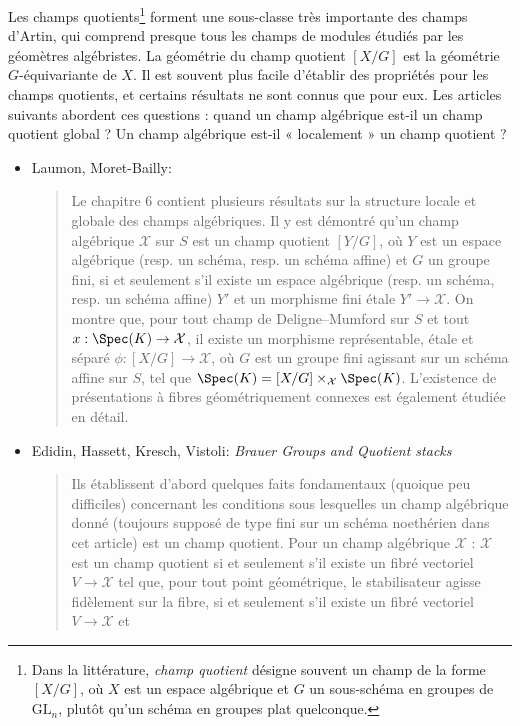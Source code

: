 \noindent
Les champs quotients\footnote{Dans la littérature,
\emph{champ quotient} désigne souvent un champ de la
forme $[X/G]$, où $X$ est un espace algébrique et $G$ un sous-schéma en groupes
de $\text{GL}_n$, plutôt qu'un schéma en groupes plat quelconque.}
forment une sous-classe très importante des champs d'Artin, qui comprend presque
tous les champs de modules étudiés par les géomètres algébristes. La géométrie
du champ quotient $[X/G]$ est la géométrie $G$-équivariante de $X$. Il est souvent
plus facile d'établir des propriétés pour les champs quotients, et certains
résultats ne sont connus que pour eux. Les articles suivants abordent ces questions :
quand un champ algébrique est-il un champ quotient global ? Un champ algébrique
est-il « localement » un champ quotient ?
\begin{itemize}
\item Laumon, Moret-Bailly: \cite[chapitre 6]{LM-B}
\begin{quote}
Le chapitre 6 contient plusieurs résultats sur la structure locale et globale
des champs algébriques. Il y est démontré qu'un champ algébrique $\mathcal{X}$ sur $S$
est un
champ quotient $[Y/G]$, où $Y$ est un espace algébrique (resp. un schéma, resp. un
schéma affine) et $G$ un groupe fini, si et seulement s'il existe un espace algébrique
(resp. un schéma, resp. un schéma affine) $Y'$ et un morphisme fini étale $Y'
\to \mathcal{X}$. On montre que, pour tout champ de Deligne--Mumford sur $S$ et tout
$x : \Spec(K) \to \mathcal{X}$, il existe un morphisme représentable, étale et
séparé $\phi : [X/G] \to \mathcal{X}$, où $G$ est un groupe fini
agissant sur un schéma affine sur $S$, tel
que $\Spec(K) = [X/G] \times_\mathcal{X} \Spec(K)$.
L'existence de présentations
à fibres géométriquement connexes est également étudiée en détail.
\end{quote}
\item
Edidin, Hassett, Kresch, Vistoli:
\emph{Brauer Groups and Quotient stacks} \cite{ehkv}
\begin{quote}
Ils établissent d'abord quelques faits fondamentaux (quoique peu difficiles)
concernant
les conditions sous lesquelles un champ algébrique donné (toujours supposé de type
fini sur un schéma noethérien dans cet article) est un champ quotient. Pour un champ
algébrique $\mathcal{X}$ : $\mathcal{X}$ est un champ quotient si et seulement s'il
existe un fibré vectoriel $V \to \mathcal{X}$ tel que, pour tout
point géométrique, le stabilisateur agisse fidèlement sur la fibre,
si et seulement s'il existe un fibré vectoriel $V \to \mathcal{X}$ et

\end{quote}
\end{itemize}
